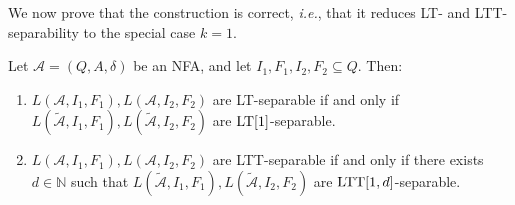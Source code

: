\documentclass{LMCS}
\newcommand\nat{\ensuremath{\mathbb{N}}\xspace}
\newcommand\As{\ensuremath{\mathcal{A}}\xspace}
\newcommand{\lt}{\textup{LT}\xspace}
\newcommand{\ltt}{\textup{LTT}\xspace}
\theoremstyle{plain}
\begin{document}
We now prove that the construction is correct, \emph{i.e.}, that it
reduces \lt- and \ltt-separability to the special case $k=1$.

\begin{lem} \label{lem:reducor} Let $\As=(Q,A,\delta)$  be an NFA, and let
  $I_1,F_1,I_2,F_2\subseteq Q$. Then:
  \begin{enumerate}
  \item $L(\As,I_1,F_1),L(\As,I_2,F_2)$ are \lt-separable if and only if
    $L(\widetilde{\As},I_1,F_1),L(\widetilde{\As},I_2,F_2)$ are $\lt[1]$-separable.
  \item $L(\As,I_1,F_1),L(\As,I_2,F_2)$ are \ltt-separable if and only if there
    exists $d \in \nat$ such that $L(\widetilde{\As},I_1,F_1),L(\widetilde{\As},I_2,F_2)$
    are $\ltt[1,d]$-separable.
  \end{enumerate}
\end{lem}
\end{document}
